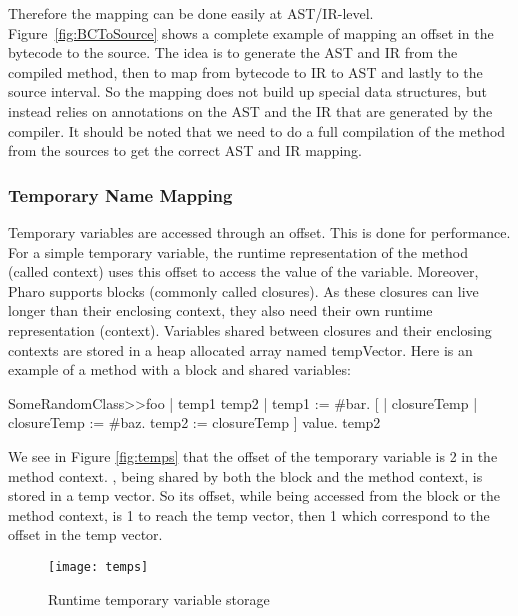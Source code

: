 \documentclass[preprint,10pt]{sigplanconf}
\begin{document}
Therefore the mapping can be done easily at AST/IR-level. Figure~\ref{fig:BCToSource} shows a complete example of mapping an offset in the bytecode to the source.
The idea is to generate the AST and IR from the compiled method, then to map from bytecode to IR to AST and lastly to the source interval. 
So the mapping does not build up special data structures, but instead relies on annotations on the AST and the IR that are generated by the compiler.
It should be noted that we need to do a full compilation of the method from the sources to get the correct AST and IR mapping.

\subsubsection{Temporary Name Mapping}
\label{sec:tempNamesMapping}

Temporary variables are accessed through an offset. This is done for performance. For a simple temporary variable, the runtime representation of the method (called context) uses this offset to access the value of the variable. Moreover, Pharo supports blocks (commonly called closures). As these closures can live longer than their enclosing context, they also need their own runtime representation (context). Variables shared between closures and their enclosing contexts are stored in a heap allocated array named tempVector. Here is an example of a method with a block and shared variables:

\begin{code}{}
SomeRandomClass>>foo
        | temp1 temp2 |
        temp1 := #bar.
        [ | closureTemp |
        closureTemp := #baz.
        temp2 := closureTemp ] value.
        \ret temp2
\end{code}

We see in Figure \ref{fig:temps} that the offset of the temporary variable  is 2 in the method context. , being shared by both the block and the method context, is stored in a temp vector. So its offset, while being accessed from the block or the method context, is 1 to reach the temp vector, then 1 which correspond to the offset in the temp vector.

\begin{figure}[ht]
\begin{center}
	\texttt{[image: temps]}
	\caption{Runtime temporary variable storage}
\end{center}
\end{figure}
\end{document}
